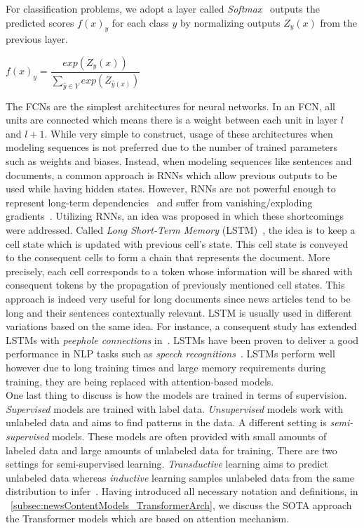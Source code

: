 For classification problems, we adopt a layer called \emph{Softmax}~\parencite{Softmax_Bridle} outputs the predicted scores $f(x)_y$ for each class $y$ by normalizing outputs $Z_y(x)$ from the previous layer.\\
\begin{center}
    $f(x)_y = \dfrac{exp(Z_y(x))}{\sum_{\hat{y} \in Y} exp(Z_{\hat{y}(x)})}$
\end{center}
The FCNs are the simplest architectures for neural networks. In an FCN, all units are connected which means there is a weight between each unit in layer $l$ and $l+1$. While very simple to construct, usage of these architectures when modeling sequences is not preferred due to the number of trained parameters such as weights and biases. Instead, when modeling sequences like sentences and documents, a common approach is RNNs which allow previous outputs to be used while having hidden states. However, RNNs are not powerful enough to represent long-term dependencies~\parencite{LearningLongTermDependenciesHard_Bengio} and suffer from vanishing/exploding gradients~\parencite{OnTheDifficultyOfTrainingRNNs_Pascanu}. Utilizing RNNs, an idea was proposed in which these shortcomings were addressed. Called \emph{Long Short-Term Memory} (LSTM)~\parencite{LSTM_Hochreiter}, the idea is to keep a cell state which is updated with previous cell's state. This cell state is conveyed to the consequent cells to form a chain that represents the document. More precisely, each cell corresponds to a token whose information will be shared with consequent tokens by the propagation of previously mentioned cell states. This approach is indeed very useful for long documents since news articles tend to be long and their sentences contextually relevant. LSTM is usually used in different variations based on the same idea. For instance, a consequent study has extended LSTMs with \emph{peephole connections} in~\parencite{LSTMPeephole_Gers}. LSTMs have been proven to deliver a good performance in NLP tasks such as \emph{speech recognitions}~\parencite{AchievingHumanParityinConvSR_Wayne}. LSTMs perform well however due to long training times and large memory requirements during training, they are being replaced with attention-based models.\\
One last thing to discuss is how the models are trained in terms of supervision. \emph{Supervised} models are trained with label data. \emph{Unsupervised} models work with unlabeled data and aims to find patterns in the data. A different setting is \emph{semi-supervised} models. These models are often provided with small amounts of labeled data and large amounts of unlabeled data for training. There are two settings for semi-supervised learning. \emph{Transductive} learning aims to predict unlabeled data whereas \emph{inductive} learning samples unlabeled data from the same distribution to
infer~\parencite{LearningByTransduction_Gammerman}. Having introduced all necessary notation and definitions, in ~\ref{subsec:newsContentModels_TransformerArch}, we discuss the SOTA approach the Transformer models which are based on attention mechanism.

